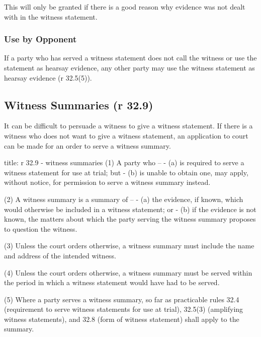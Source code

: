 \documentclass[
]{article}
\newenvironment{Shaded}{}{}
\newcommand{\NormalTok}[1]{#1}
\begin{document}
This will only be granted if there is a good reason why evidence was not
dealt with in the witness statement.

\hypertarget{use-by-opponent}{%
\subsubsection{Use by Opponent}\label{use-by-opponent}}

If a party who has served a witness statement does not call the witness
or use the statement as hearsay evidence, any other party may use the
witness statement as hearsay evidence (r 32.5(5)).

\hypertarget{witness-summaries-r-32.9}{%
\subsection{Witness Summaries (r 32.9)}\label{witness-summaries-r-32.9}}

It can be difficult to persuade a witness to give a witness statement.
If there is a witness who does not want to give a witness statement, an
application to court can be made for an order to serve a witness
summary.

\begin{Shaded}
\begin{Highlighting}[]
\NormalTok{title: r 32.9 {-} witness summaries}
\NormalTok{(1) A party who –}
\NormalTok{{-} (a) is required to serve a witness statement for use at trial; but}
\NormalTok{{-} (b) is unable to obtain one, may apply, without notice, for permission to serve a witness summary instead.}

\NormalTok{(2) A witness summary is a summary of –}
\NormalTok{{-} (a) the evidence, if known, which would otherwise be included in a witness statement; or}
\NormalTok{{-} (b) if the evidence is not known, the matters about which the party serving the witness summary proposes to question the witness.}

\NormalTok{(3) Unless the court orders otherwise, a witness summary must include the name and address of the intended witness.}

\NormalTok{(4) Unless the court orders otherwise, a witness summary must be served within the period in which a witness statement would have had to be served.}

\NormalTok{(5) Where a party serves a witness summary, so far as practicable rules 32.4 (requirement to serve witness statements for use at trial), 32.5(3) (amplifying witness statements), and 32.8 (form of witness statement) shall apply to the summary.}
\end{Highlighting}
\end{Shaded}
\end{document}
